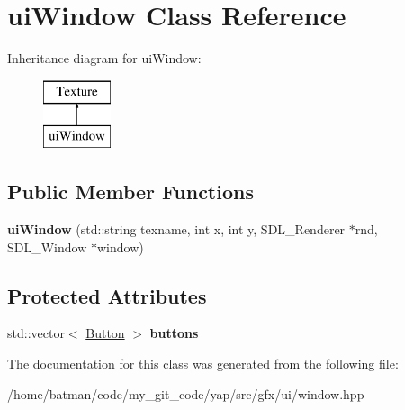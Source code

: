 \hypertarget{classuiWindow}{}\section{ui\+Window Class Reference}
\label{classuiWindow}
Inheritance diagram for ui\+Window\+:\begin{figure}[H]
\begin{center}
\leavevmode
\includegraphics[height=2.000000cm]{classuiWindow}
\end{center}
\end{figure}
\subsection*{Public Member Functions}
\begin{DoxyCompactItemize}
\item 
\hypertarget{classuiWindow_ae3f70599ad9b8b7cbc04897c952c0003}{}{\bfseries ui\+Window} (std\+::string texname, int x, int y, S\+D\+L\+\_\+\+Renderer $\ast$rnd, S\+D\+L\+\_\+\+Window $\ast$window)\label{classuiWindow_ae3f70599ad9b8b7cbc04897c952c0003}

\end{DoxyCompactItemize}
\subsection*{Protected Attributes}
\begin{DoxyCompactItemize}
\item 
\hypertarget{classuiWindow_a059e97109d34fb9e0337ad51bc326bd0}{}std\+::vector$<$ \hyperlink{classButton}{Button} $>$ {\bfseries buttons}\label{classuiWindow_a059e97109d34fb9e0337ad51bc326bd0}

\end{DoxyCompactItemize}


The documentation for this class was generated from the following file\+:\begin{DoxyCompactItemize}
\item 
/home/batman/code/my\+\_\+git\+\_\+code/yap/src/gfx/ui/window.\+hpp\end{DoxyCompactItemize}
